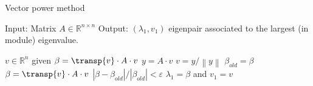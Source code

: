 \begin{algorithm}[H]
\begin{algorithmic}
\caption{\label{alg:power} Vector power method}
\STATE Input: Matrix \(A \in \mathbb{R}^{n\times n}\)
\STATE Output: $(\lambda_1,v_1)$ eigenpair associated to the largest (in module)
eigenvalue.

\STATE $v\in\mathbb{R}^n $ given
\STATE \(\beta=\transp{v}\cdot A\cdot v\)
\REPEAT
\STATE\(y=A\cdot v\)
\STATE\(v=y/\left\|y\right\|\)
\STATE\(\beta_{old} = \beta\)
\STATE\(\beta=\transp{v}\cdot A\cdot v\)
\UNTIL  \(\left|\beta-\beta_{old}\right|/\left|\beta_{old}\right|<\varepsilon\)  
\STATE \(\lambda_1=\beta\) and \(v_1=v\)
\end{algorithmic}
\end{algorithm}
